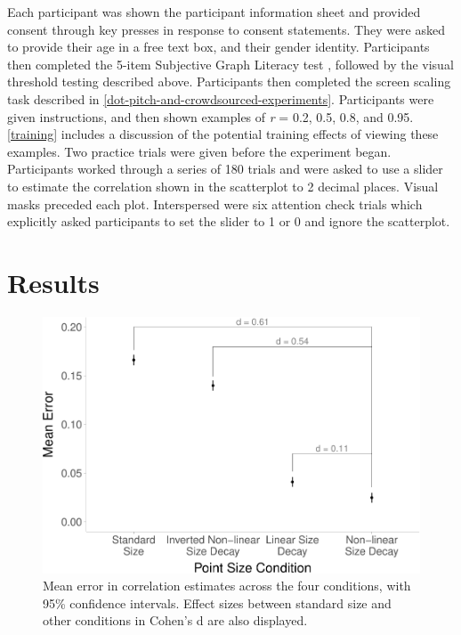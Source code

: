 \documentclass{vgtc}                          %
\begin{document}
Each participant was shown the participant information sheet and provided
consent through key presses in response to consent statements. They were asked
to provide their age in a free text box, and their gender identity. Participants
then completed the 5-item Subjective Graph Literacy test \cite{garcia_2016},
followed by the visual threshold testing described above. Participants then completed
the screen scaling task described in \autoref{dot-pitch-and-crowdsourced-experiments}.
Participants were given instructions, and then shown examples of \emph{r} = 0.2, 0.5, 0.8, and
0.95. \autoref{training} includes a discussion of the potential training effects of
viewing these examples. Two practice trials were given before the experiment began.
Participants worked through a series of 180 trials
and were asked to use a slider to estimate the correlation shown in
the scatterplot to 2 decimal places. Visual masks preceded each plot. Interspersed were six attention
check trials which explicitly asked participants to set the slider to 1 or 0 and ignore the scatterplot.

\hypertarget{results}{%
\section{Results}\label{results}}

\begin{figure}
\includegraphics[width=1\linewidth]{size_and_scatterplots_files/figure-latex/dot-plot-1} \caption{Mean error in correlation estimates across the four conditions, with 95\% confidence intervals. Effect sizes between standard size and other conditions in Cohen's d are also displayed.}\label{fig:dot-plot}
\end{figure}
\end{document}
